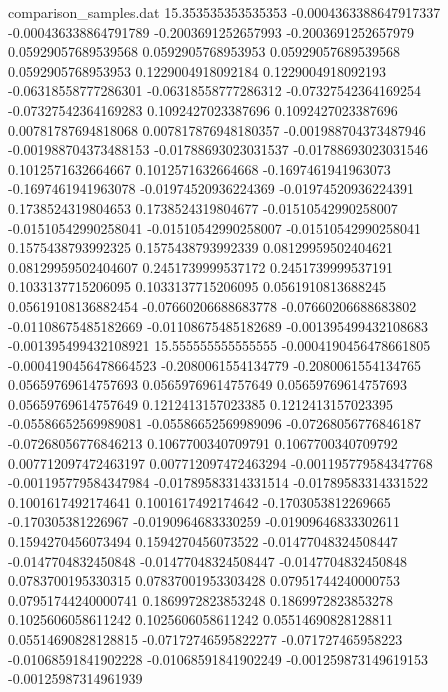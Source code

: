 \begin{filecontents}{comparison_samples.dat}
15.353535353535353  -0.0004363388647917337  -0.000436338864791789   -0.2003691252657993    -0.2003691252657979    0.05929057689539568    0.0592905768953953     0.05929057689539568    0.0592905768953953     0.1229004918092184     0.1229004918092193     -0.06318558777286301    -0.06318558777286312    -0.07327542364169254   -0.07327542364169283   0.1092427023387696      0.1092427023387696      0.00781787694818068     0.007817876948180357    -0.001988704373487946   -0.001988704373488153   -0.01788693023031537    -0.01788693023031546    0.1012571632664667      0.1012571632664668      -0.1697461941963073     -0.1697461941963078     -0.01974520936224369   -0.01974520936224391   0.1738524319804653     0.1738524319804677     -0.01510542990258007    -0.01510542990258041    -0.01510542990258007    -0.01510542990258041    0.1575438793992325     0.1575438793992339     0.08129959502404621     0.08129959502404607     0.2451739999537172     0.2451739999537191     0.1033137715206095      0.1033137715206095      0.0561910813688245      0.05619108136882454     -0.07660206688683778   -0.07660206688683802   -0.01108675485182669   -0.01108675485182689   -0.001395499432108683   -0.001395499432108921 
15.555555555555555  -0.0004190456478661805  -0.0004190456478664523  -0.2080061554134779    -0.2080061554134765    0.05659769614757693    0.05659769614757649    0.05659769614757693    0.05659769614757649    0.1212413157023385     0.1212413157023395     -0.05586652569989081    -0.05586652569989096    -0.07268056776846187   -0.07268056776846213   0.1067700340709791      0.1067700340709792      0.007712097472463197    0.007712097472463294    -0.001195779584347768   -0.001195779584347984   -0.01789583314331514    -0.01789583314331522    0.1001617492174641      0.1001617492174642      -0.1703053812269665     -0.170305381226967      -0.0190964683330259    -0.01909646833302611   0.1594270456073494     0.1594270456073522     -0.01477048324508447    -0.0147704832450848     -0.01477048324508447    -0.0147704832450848     0.0783700195330315     0.07837001953303428    0.07951744240000753     0.07951744240000741     0.1869972823853248     0.1869972823853278     0.1025606058611242      0.1025606058611242      0.05514690828128811     0.05514690828128815     -0.07172746595822277   -0.071727465958223     -0.01068591841902228   -0.01068591841902249   -0.001259873149619153   -0.00125987314961939  

\end{filecontents}
